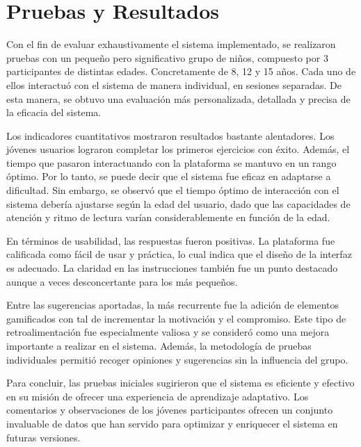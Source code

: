 \chapter{Pruebas y Resultados} \label{chap:resultadosExperimentales}

Con el fin de evaluar exhaustivamente el sistema implementado, se realizaron pruebas con un pequeño pero significativo grupo de niños, compuesto por 3 participantes de distintas edades. Concretamente de 8, 12 y 15 años. Cada uno de ellos interactuó con el sistema de manera individual, en sesiones separadas. De esta manera, se obtuvo una evaluación más personalizada, detallada y precisa de la eficacia del sistema.

Los indicadores cuantitativos mostraron resultados bastante alentadores. Los jóvenes usuarios lograron completar los primeros ejercicios con éxito. Además, el tiempo que pasaron interactuando con la plataforma se mantuvo en un rango óptimo. Por lo tanto, se puede decir que el sistema fue eficaz en adaptarse a dificultad. Sin embargo, se observó que el tiempo óptimo de interacción con el sistema debería ajustarse según la edad del usuario, dado que las capacidades de atención y ritmo de lectura varían considerablemente en función de la edad. 

En términos de usabilidad, las respuestas fueron positivas. La plataforma fue calificada como fácil de usar y práctica, lo cual indica que el diseño de la interfaz es adecuado. La claridad en las instrucciones también fue un punto destacado aunque a veces desconcertante para los más pequeños.

Entre las sugerencias aportadas, la más recurrente fue la adición de elementos gamificados con tal de incrementar la motivación y el compromiso. Este tipo de retroalimentación fue especialmente valiosa y se consideró como una mejora importante a realizar en el sistema. Además, la metodología de pruebas individuales permitió recoger opiniones y sugerencias sin la influencia del grupo.

Para concluir, las pruebas iniciales sugirieron que el sistema es eficiente y efectivo en su misión de ofrecer una experiencia de aprendizaje adaptativo. Los comentarios y observaciones de los jóvenes participantes ofrecen un conjunto invaluable de datos que han servido para optimizar y enriquecer el sistema en futuras versiones.